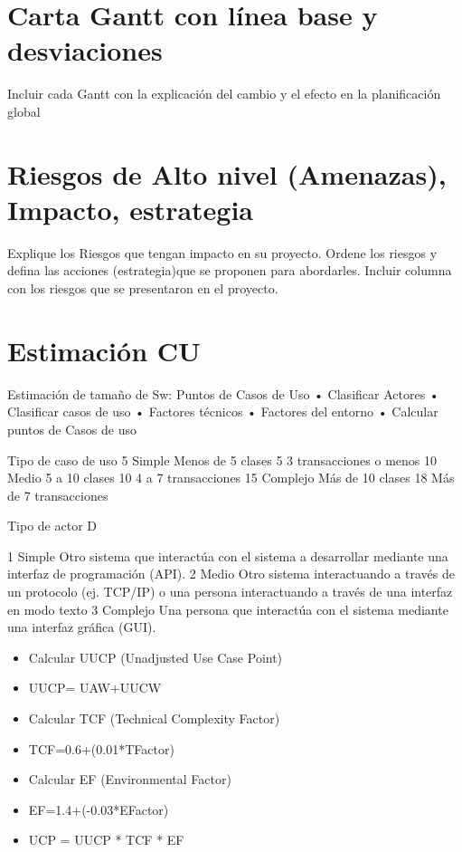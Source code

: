 \section{Carta Gantt con línea base y desviaciones}
Incluir cada Gantt con la explicación del cambio y el efecto en la planificación global
\section{Riesgos de Alto nivel (Amenazas), Impacto, estrategia}
Explique los Riesgos que tengan impacto en su proyecto. Ordene los riesgos y defina las acciones (estrategia)que se proponen para abordarles.
Incluir columna con los riesgos que se presentaron en el proyecto.
        
\section{Estimación CU}
Estimación de tamaño de Sw: Puntos de Casos de Uso
    • Clasificar Actores
    • Clasificar casos de uso
    • Factores técnicos
    • Factores del entorno
    • Calcular puntos de Casos de uso


Tipo de caso de uso 
5   Simple      Menos de 5 clases 5    3 transacciones o menos
10  Medio       5 a 10 clases 10       4 a 7 transacciones
15  Complejo    Más de 10 clases 18    Más de 7 transacciones

Tipo de actor D

1   Simple  Otro sistema que interactúa con el sistema a desarrollar mediante una interfaz de programación (API).
2   Medio   Otro sistema interactuando a través de un protocolo (ej. TCP/IP) o una persona interactuando a través de una interfaz en modo texto
3   Complejo    Una persona que interactúa con el sistema mediante una interfaz gráfica (GUI).

\begin{itemize}
    \item Calcular UUCP (Unadjusted Use Case Point)
    \item UUCP= UAW+UUCW 
    \item Calcular  TCF (Technical Complexity Factor)
    \item TCF=0.6+(0.01*TFactor)
    \item Calcular  EF (Environmental Factor)
    \item EF=1.4+(-0.03*EFactor)
    \item UCP = UUCP * TCF * EF
\end{itemize}

